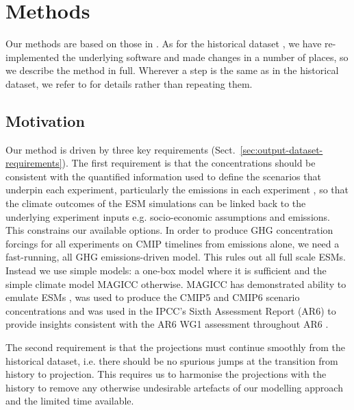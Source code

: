 \section{Methods}
\label{sec:methods}

Our methods are based on those in \citet{meinshausen_ssp-ghgs_2020}.
As for the historical dataset \citep{nicholls_historical-ghgs_2026},
we have re-implemented the underlying software and made changes in a number of places,
so we describe the method in full.
Wherever a step is the same as in the historical dataset,
we refer to \citet{nicholls_historical-ghgs_2026}
for details rather than repeating them.

\subsection{Motivation}
\label{ssec:methods-motivation}

Our method is driven by three key requirements (Sect.~\ref{sec:output-dataset-requirements}).
The first requirement is that the concentrations should be consistent with the
quantified information used to define the scenarios that underpin each experiment,
particularly the emissions in each experiment \citep{kikstra_scenariomip-emissions_2026,hogner_vl-cf-emissions_2026},
so that the climate outcomes of the ESM simulations can be linked back to the underlying experiment inputs
e.g. socio-economic assumptions and emissions.
This constrains our available options.
In order to produce GHG concentration forcings for all experiments on CMIP timelines from emissions alone,
we need a fast-running, all GHG emissions-driven model.
This rules out all full scale ESMs.
Instead we use simple models: a one-box model where it is sufficient
and the simple climate model MAGICC \citep{meinshausen_magicc6-part-1_2011,meinshausen_ssp-ghgs_2020} otherwise.
MAGICC has demonstrated ability to emulate ESMs \citep{meinshausen_magicc6-part-1_2011,nicholls_rcmip-phase-2_2021},
was used to produce the CMIP5 and CMIP6 scenario concentrations \citep{meinshausen_rcp-concentrations_2011,meinshausen_ssp-ghgs_2020}
and was used in the IPCC's Sixth Assessment Report (AR6) to provide insights consistent with the AR6 WG1 assessment throughout AR6 \citep{IPCC_AR6-WG1-Ch-7_2021,kikstra_ar6-climate-assessment_2022}.

The second requirement is that the projections must continue smoothly from the historical dataset,
i.e. there should be no spurious jumps at the transition from history to projection.
This requires us to harmonise the projections with the history
to remove any otherwise undesirable artefacts of our modelling approach and the limited time available.

